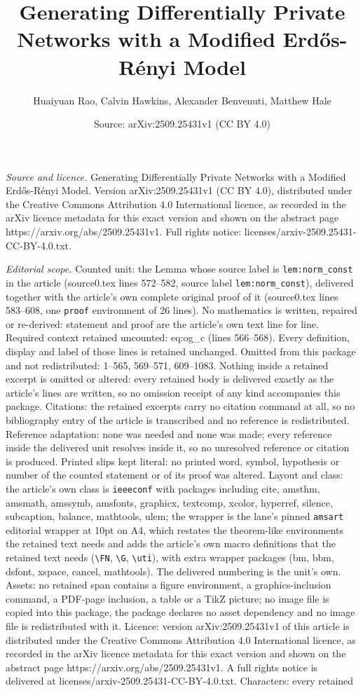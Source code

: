 \documentclass[10pt,a4paper]{amsart}
\title[Generating Differentially Private Networks with a Modified E]{Generating Differentially Private Networks with a Modified Erd\H{o}s-R\'{e}nyi Model}
\author{Huaiyuan Rao, Calvin Hawkins, Alexander Benvenuti, Matthew Hale}
\date{Source: arXiv:2509.25431v1 (CC BY 4.0)}
\begin{document}
\maketitle

\noindent\emph{Source and licence.} Generating Differentially Private Networks with a Modified Erd\H{o}s-R\'{e}nyi Model. Version arXiv:2509.25431v1 (CC BY 4.0), distributed under the Creative Commons Attribution 4.0 International licence, as recorded in the arXiv licence metadata for this exact version and shown on the abstract page https://arxiv.org/abs/2509.25431v1. Full rights notice: licenses/arxiv-2509.25431-CC-BY-4.0.txt.\par\smallskip

\noindent\textit{Editorial scope.} Counted unit: the Lemma whose source label is \texttt{lem:norm\_const} in the article (source0.tex lines 572--582, source label \texttt{lem:norm\_const}), delivered together with the article's own complete original proof of it (source0.tex lines 583--608, one \texttt{proof} environment of 26 lines). No mathematics is written, repaired or re-derived: statement and proof are the article's own text line for line. Required context retained uncounted: eq:og\_c (lines 566--568). Every definition, display and label of those lines is retained unchanged. Omitted from this package and not redistributed: 1--565, 569--571, 609--1083. Nothing inside a retained excerpt is omitted or altered: every retained body is delivered exactly as the article's lines are written, so no omission receipt of any kind accompanies this package. Citations: the retained excerpts carry no citation command at all, so no bibliography entry of the article is transcribed and no reference is redistributed. Reference adaptation: none was needed and none was made; every reference inside the delivered unit resolves inside it, so no unresolved reference or citation is produced. Printed slips kept literal: no printed word, symbol, hypothesis or number of the counted statement or of its proof was altered. Layout and class: the article's own class is \texttt{ieeeconf} with packages including cite, amsthm, amsmath, amssymb, amsfonts, graphicx, textcomp, xcolor, hyperref, silence, subcaption, balance, mathtools, ulem; the wrapper is the lane's pinned \texttt{amsart} editorial wrapper at 10pt on A4, which restates the theorem-like environments the retained text needs and adds the article's own macro definitions that the retained text needs (\texttt{\textbackslash FN}, \texttt{\textbackslash G}, \texttt{\textbackslash uti}), with extra wrapper packages (bm, bbm, dsfont, xspace, cancel, mathtools). The delivered numbering is the unit's own. Assets: no retained span contains a figure environment, a graphics-inclusion command, a PDF-page inclusion, a table or a TikZ picture; no image file is copied into this package, the package declares no asset dependency and no image file is redistributed with it. Licence: version arXiv:2509.25431v1 of this article is distributed under the Creative Commons Attribution 4.0 International licence, as recorded in the arXiv licence metadata for this exact version and shown on the abstract page https://arxiv.org/abs/2509.25431v1. A full rights notice is delivered at licenses/arxiv-2509.25431-CC-BY-4.0.txt. Characters: every retained 
\end{document}
